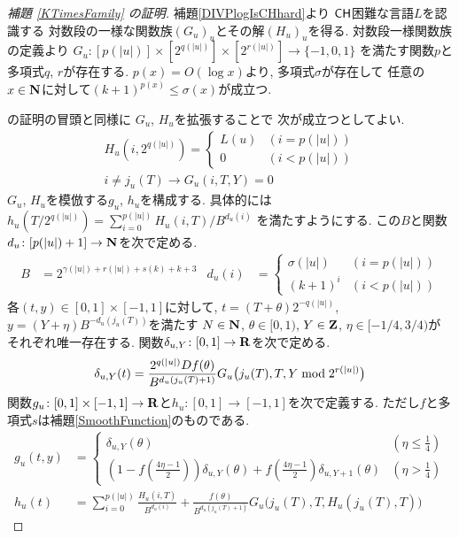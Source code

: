  \begin{proof}[\rm 補題 \ref{KTimesFamily} の証明]
  補題\ref{DIVPlogIsCHhard}より
  $\mathsf{CH}$困難な言語$L$を認識する
  対数段の一様な関数族$(G_u)_u$とその解$(H_u)_u$を得る.
  対数段一様関数族の定義より 
  $G_u \colon [p(|u|)] \times [2^{q(|u|)}] \times [2^{r(|u|)}] \to \{-1, 0, 1\}$
  を満たす関数$p$と多項式$q$, $r$が存在する. 
  $p (x) = O (\log x)$より, 
  多項式$\sigma$が存在して
  任意の$x \in \mathbf N$に対して$(k+1)^{p(x)} \le \sigma(x)$が成立つ. 

  \cite[補題4.1]{kawamura2010lipschitz}の証明の冒頭と同様に
  $G _u$, $H _u$を拡張することで
  次が成立つとしてよい.
  \begin{gather}
   H_u(i, 2^{q(|u|)}) = \begin{cases}
			L(u) & (i=p(|u|)) \\
			0 & (i<p(|u|))
			\end{cases}
   \\
   i \not = j_u(T)  \to G_u(i, T, Y) = 0 
  \end{gather}
  $G _u$, $H _u$を模倣する$g _u$, $h _u$を構成する.
  具体的には$h_u(T/2^{q(|u|)}) = \sum^{p(|u|)}_{i = 0}H_u(i, T)/B^{d_u(i)}$
  を満たすようにする. この$B$と関数$d_u \colon [p(|u|)+1] \to \mathbf N$を次で定める. 
  \begin{align}
   B &= 2^{\gamma(|u|) + r(|u|) + s(k) + k + 3}
   &
   d_u(i) &= 
   \begin{cases}
    \sigma(|u|) & (i=p(|u|)) 
    \\
    (k+1)^i & (i<p(|u|))
   \end{cases}
  \end{align}
各$(t, y) \in [0,1] \times [-1, 1]$に対して,
$t = (T + \theta)2^{-q(|u|)}$, $y = (Y + \eta)B^{-d_u(j_u(T))}$を満たす
$N \in \mathbf N$, 
$\theta \in [0,1)$, 
$Y \in \mathbf Z$, 
$\eta \in [-1/4, 3/4)$が
それぞれ唯一存在する.
関数$\delta_{u,Y} \colon [0,1] \to \mathbf R$を次で定める. 
 \begin{equation} \label{eq:delta}
  \delta_{u, Y} (t) = \frac{2^{q(|u|)} D f(\theta)}{B^{d_u(j_u(T)+1)}} 
   G_u \bigl( j_u(T), T, Y \bmod 2^{r(|u|)} \bigr)
 \end{equation}
関数$
g _u \colon [0, 1] \times [-1, 1] \to \mathbf R
$と$
h _u \colon [0, 1] \to [-1, 1]
$を次で定義する.
ただし$f$と多項式$s$は補題\ref{SmoothFunction}のものである.
  \begin{align}
  \label{eq:gu}
  g_u(t,y) 
  &= \begin{cases}
     \delta_{u, Y}(\theta)
     & (\eta \le \frac 1 4)
     \\
     ( 1-f ( \frac{4\eta-1}{2})) \delta_{u, Y}(\theta) 
     + f ( \frac{4\eta-1}{2}) \delta_{u,Y+1}(\theta)
     & (\eta > \frac 1 4)
    \end{cases}
   \\
  h_u(t) 
   &= \sum^{p(|u|)}_{i=0} \frac{H_u(i, T)}{B^{d_u(i)}}  
  + \frac{f(\theta)}{B^{d_u(j_u(T)+1)}} G_u \bigl( j_u(T), T, H_u(j_u(T), T) \bigr) 
  \label{eq:hu}
  \end{align}


\end{proof}
